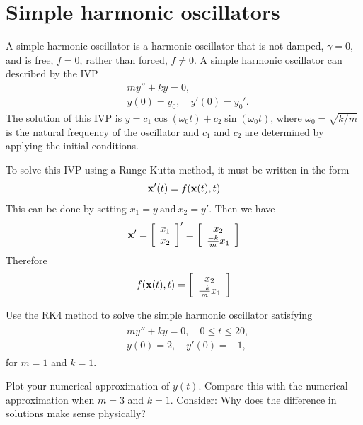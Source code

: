\section*{Simple harmonic oscillators}
A simple harmonic oscillator is a harmonic oscillator that is not damped, $\gamma =0$, and is free, $f = 0$, rather than forced, $f \not = 0$. 
A simple harmonic oscillator can described by the IVP
\begin{align*}
&{}my'' + ky = 0,\\
&{}y(0) = y_0,\quad
y'(0) = y_0'.
\end{align*}
The solution of this IVP is $y = c_1\cos (\omega_0 t) + c_2 \sin (\omega_0 t)$, where $\omega_0 = \sqrt{k/m}$ is the natural frequency of the oscillator and $c_1$ and $c_2$ are determined by applying the initial conditions.

To solve this IVP using a Runge-Kutta method, it must be written in the form
\[\mathbf{x}'(t) = f(\mathbf{x}(t),t) \]
This can be done by setting $x_1 = y \ \text{and} \ x_2 = y'$. Then we have \[     \mathbf{x}'=
 \left[\begin{array}{c}x_1 \\x_2\end{array}\right]'  =  \left[\begin{array}{c}x_2 \\\frac{-k}{m}x_1\end{array}\right]\]
Therefore$$f(\mathbf{x}(t),t) = \left[\begin{array}{c}x_2 \\\frac{-k}{m}x_1\end{array}\right]$$

\begin{problem} Use the RK4 method to solve the simple harmonic oscillator satisfying 
\begin{align}
	\begin{split}
&{}my'' + ky = 0,\quad 0 \leq t \leq 20, \\
&{}y(0) = 2, \quad
y'(0) = -1,
	\end{split}
	\label{ivp:simple_oscillator}
\end{align}
for $m = 1$ and $k =1$.

Plot your numerical approximation of $y(t)$.  
Compare this with the numerical approximation when $m = 3$ and $k =1$. Consider: Why does the difference in solutions make sense physically?
\end{problem}


